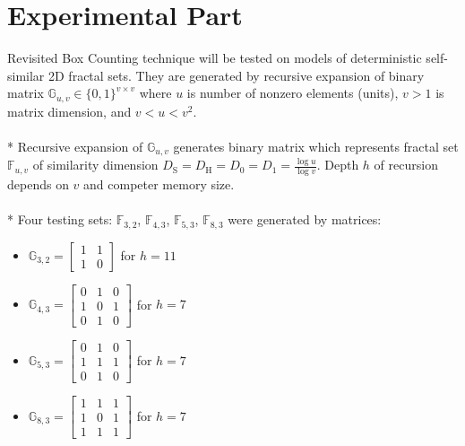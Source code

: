 \section {Experimental Part }

Revisited Box Counting technique will be tested on models of deterministic self-similar 2D fractal sets. They are generated by recursive expansion of binary matrix $\mathbb{G}_{u,v} \in \{ 0, 1 \}^{v \times v} $ where $u$ is number of nonzero elements (units), $v>1$ is matrix dimension, and $v<u<v^2$. \\
\\*
Recursive expansion of $\mathbb{G}_{u,v}$ generates binary matrix which represents fractal set $\mathbb{F}_{u,v}$ of similarity dimension $D_{\text{S}} = D_{\text{H}} = D_{0} = D_{1} = \frac{\log{u}}{\log{v}}$. Depth $h$ of recursion depends on $v$ and competer memory size.\\
\\*
Four testing sets: $\mathbb{F}_{3,2}$, $\mathbb{F}_{4,3}$, $\mathbb{F}_{5,3}$, $\mathbb{F}_{8,3}$ were generated by matrices:
\begin{itemize}
\item 

$\mathbb{G}_{3,2} = \begin{bmatrix}
1 & 1 \\
1 & 0 
\end{bmatrix}$ for $h=11$ 

\item 

$\mathbb{G}_{4,3} = \begin{bmatrix}
0 & 1 & 0 \\
1 & 0 & 1 \\
0 & 1 & 0
\end{bmatrix}$ for $h=7$

\item 

$\mathbb{G}_{5,3} = \begin{bmatrix}
0 & 1 & 0 \\
1 & 1 & 1 \\
0 & 1 & 0
\end{bmatrix}$ for $h=7$

\item 

$\mathbb{G}_{8,3} = \begin{bmatrix}
1 & 1 & 1 \\
1 & 0 & 1 \\
1 & 1 & 1
\end{bmatrix}$ for $h=7$
\end{itemize}
